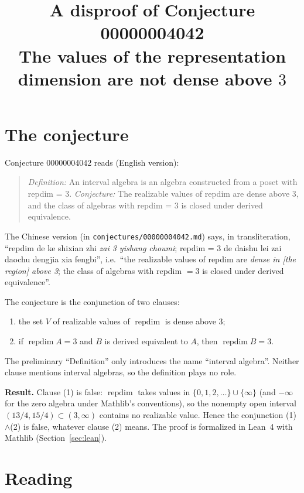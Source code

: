 \documentclass[11pt]{article}
\title{A disproof of Conjecture 00000004042\\[2pt]
\large The values of the representation dimension are not dense above $3$}
\date{}
\theoremstyle{definition}
\theoremstyle{remark}
\renewcommand{\_}{\oldus\allowbreak}
\newcommand{\repdim}{\operatorname{repdim}}
\begin{document}
\sloppy
\maketitle

\section{The conjecture}

Conjecture 00000004042 reads (English version):

\begin{quote}
\emph{Definition:} An interval algebra is an algebra constructed from a poset with repdim = 3.
\emph{Conjecture:} The realizable values of repdim are dense above 3, and the class of algebras with
repdim = 3 is closed under derived equivalence.
\end{quote}

The Chinese version (in \texttt{conjectures/00000004042.md}) says, in transliteration,
``repdim de ke shixian zhi \emph{zai 3 yishang choumi}; repdim = 3 de daishu lei zai daochu dengjia xia
fengbi'', i.e.\ ``the realizable values of repdim are \emph{dense in [the region] above 3}; the class of
algebras with repdim $=3$ is closed under derived equivalence''.

The conjecture is the conjunction of two clauses:
\begin{enumerate}[label=(\arabic*)]
  \item the set $V$ of realizable values of $\repdim$ is dense above $3$;
  \item if $\repdim A = 3$ and $B$ is derived equivalent to $A$, then $\repdim B = 3$.
\end{enumerate}
The preliminary ``Definition'' only introduces the name ``interval algebra''. Neither clause mentions
interval algebras, so the definition plays no role.

\textbf{Result.} Clause (1) is false: $\repdim$ takes values in $\{0,1,2,\dots\}\cup\{\infty\}$ (and
$-\infty$ for the zero algebra under Mathlib's conventions), so the nonempty open interval
$(13/4, 15/4) \subset (3,\infty)$ contains no realizable value. Hence the conjunction (1)$\wedge$(2) is
false, whatever clause (2) means. The proof is formalized in Lean~4 with Mathlib (Section~\ref{sec:lean}).

\section{Reading}\label{sec:reading}
\end{document}
